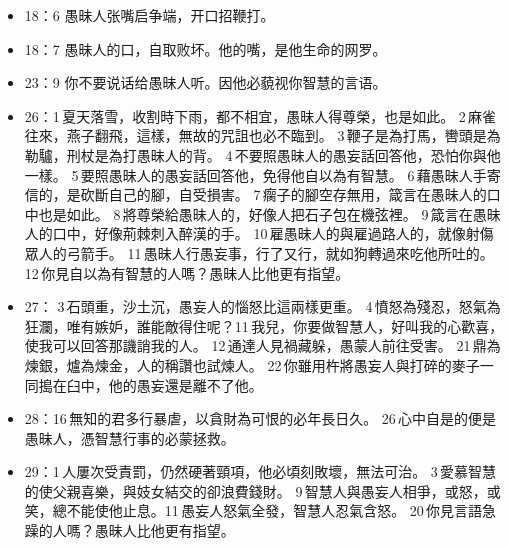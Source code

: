 \begin{itemize}
\item 18：6 愚昧人张嘴启争端，开口招鞭打。
\item 18：7 愚昧人的口，自取败坏。他的嘴，是他生命的网罗。
\item 23：9 你不要说话给愚昧人听。因他必藐视你智慧的言语。
\item 26：1 夏天落雪，收割時下雨，都不相宜，愚昧人得尊榮，也是如此。 2 麻雀往來，燕子翻飛，這樣，無故的咒詛也必不臨到。 3 鞭子是為打馬，轡頭是為勒驢，刑杖是為打愚昧人的背。 4 不要照愚昧人的愚妄話回答他，恐怕你與他一樣。 5 要照愚昧人的愚妄話回答他，免得他自以為有智慧。 6 藉愚昧人手寄信的，是砍斷自己的腳，自受損害。 7 瘸子的腳空存無用，箴言在愚昧人的口中也是如此。 8 將尊榮給愚昧人的，好像人把石子包在機弦裡。 9 箴言在愚昧人的口中，好像荊棘刺入醉漢的手。 10 雇愚昧人的與雇過路人的，就像射傷眾人的弓箭手。 11 愚昧人行愚妄事，行了又行，就如狗轉過來吃他所吐的。 12 你見自以為有智慧的人嗎？愚昧人比他更有指望。
\item 27： 3 石頭重，沙土沉，愚妄人的惱怒比這兩樣更重。 4 憤怒為殘忍，怒氣為狂瀾，唯有嫉妒，誰能敵得住呢？11 我兒，你要做智慧人，好叫我的心歡喜，使我可以回答那譏誚我的人。 12 通達人見禍藏躲，愚蒙人前往受害。 21 鼎為煉銀，爐為煉金，人的稱讚也試煉人。 22 你雖用杵將愚妄人與打碎的麥子一同搗在臼中，他的愚妄還是離不了他。
\item 28：16 無知的君多行暴虐，以貪財為可恨的必年長日久。 26 心中自是的便是愚昧人，憑智慧行事的必蒙拯救。
\item 29：1 人屢次受責罰，仍然硬著頸項，他必頃刻敗壞，無法可治。 3 愛慕智慧的使父親喜樂，與妓女結交的卻浪費錢財。 9 智慧人與愚妄人相爭，或怒，或笑，總不能使他止息。11 愚妄人怒氣全發，智慧人忍氣含怒。 20 你見言語急躁的人嗎？愚昧人比他更有指望。
\end{itemize}

